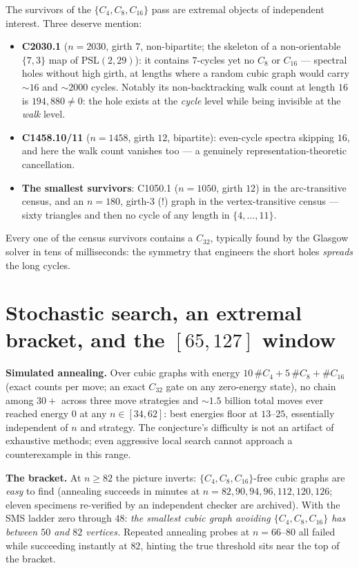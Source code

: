 \documentclass[11pt]{article}
\theoremstyle{remark}
\newcommand{\Cyc}[1]{C_{#1}}
\begin{document}
The survivors of the $\{\Cyc4,\Cyc8,\Cyc{16}\}$ pass are extremal objects of
independent interest. Three deserve mention:
\begin{itemize}
\item \textbf{C2030.1} ($n=2030$, girth $7$, non-bipartite; the skeleton of
a non-orientable $\{7,3\}$ map of $\mathrm{PSL}(2,29)$): it contains
$7$-cycles yet no $\Cyc8$ or $\Cyc{16}$ --- spectral holes without high
girth, at lengths where a random cubic graph would carry ${\sim}16$ and
${\sim}2000$ cycles. Notably its non-backtracking walk count at length
$16$ is $194{,}880 \ne 0$: the hole exists at the \emph{cycle} level while
being invisible at the \emph{walk} level.
\item \textbf{C1458.10/11} ($n=1458$, girth $12$, bipartite): even-cycle
spectra skipping $16$, and here the walk count vanishes too --- a genuinely
representation-theoretic cancellation.
\item \textbf{The smallest survivors}: C1050.1 ($n=1050$, girth $12$) in
the arc-transitive census, and an $n=180$, girth-$3$ (!) graph in the
vertex-transitive census --- sixty triangles and then no cycle of any
length in $\{4,\dots,11\}$.
\end{itemize}
Every one of the census survivors contains a $\Cyc{32}$, typically
found by the Glasgow solver in tens of milliseconds: the symmetry that
engineers the short holes \emph{spreads} the long cycles.

\section{Stochastic search, an extremal bracket, and the $[65,127]$ window}
\label{sec:window}

\textbf{Simulated annealing.} Over cubic graphs with energy
$10\,\#\Cyc4 + 5\,\#\Cyc8 + \#\Cyc{16}$ (exact counts per move; an exact
$\Cyc{32}$ gate on any zero-energy state), no chain among $30+$ across three
move strategies and ${\sim}1.5$ billion total moves ever reached energy $0$
at any $n \in [34,62]$: best energies floor at $13$--$25$, essentially
independent of $n$ and strategy. The conjecture's difficulty is not an
artifact of exhaustive methods; even aggressive local search cannot
approach a counterexample in this range.

\textbf{The bracket.} At $n \ge 82$ the picture inverts:
$\{\Cyc4,\Cyc8,\Cyc{16}\}$-free cubic graphs are \emph{easy} to find
(annealing succeeds in minutes at $n = 82, 90, 94, 96, 112, 120, 126$;
eleven specimens re-verified by an independent checker are archived). With
the SMS ladder zero through $48$: \emph{the smallest cubic graph avoiding
$\{\Cyc4, \Cyc8, \Cyc{16}\}$ has between $50$ and $82$ vertices.} Repeated
annealing probes at $n = 66$--$80$ all failed while succeeding instantly at
$82$, hinting the true threshold sits near the top of the bracket.
\end{document}
